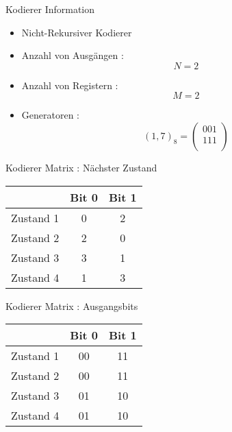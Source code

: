 \begin{frame}{Kodierer Information}

\begin{itemize}
\tightlist
\item
  Nicht-Rekursiver Kodierer
\item
  Anzahl von Ausgängen : \[N=2\]
\item
  Anzahl von Registern : \[M=2\]
\item
  Generatoren : \[(1,7)_8 = \begin{pmatrix}001 \\ 111 \\ \end{pmatrix}\]
\end{itemize}

\end{frame}

\begin{frame}{Kodierer Matrix : Nächster Zustand}

\begin{longtable}[c]{@{}lcc@{}}
\toprule
& Bit 0 & Bit 1\tabularnewline
\midrule
\endhead
Zustand 1 & 0 & 2\tabularnewline
Zustand 2 & 2 & 0\tabularnewline
Zustand 3 & 3 & 1\tabularnewline
Zustand 4 & 1 & 3\tabularnewline
\bottomrule
\end{longtable}

\end{frame}

\begin{frame}{Kodierer Matrix : Ausgangsbits}

\begin{longtable}[c]{@{}lcc@{}}
\toprule
& Bit 0 & Bit 1\tabularnewline
\midrule
\endhead
Zustand 1 & 00 & 11\tabularnewline
Zustand 2 & 00 & 11\tabularnewline
Zustand 3 & 01 & 10\tabularnewline
Zustand 4 & 01 & 10\tabularnewline
\bottomrule
\end{longtable}

\end{frame}

